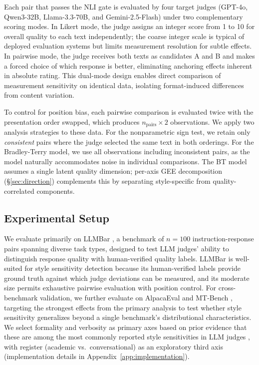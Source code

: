 Each pair that passes the NLI gate is evaluated by four target judges (GPT-4o, Qwen3-32B, Llama-3.3-70B, and Gemini-2.5-Flash) under two complementary scoring modes.
In Likert mode, the judge assigns an integer score from 1 to 10 for overall quality to each text independently; the coarse integer scale is typical of deployed evaluation systems but limits measurement resolution for subtle effects.
In pairwise mode, the judge receives both texts as candidates A and B and makes a forced choice of which response is better, eliminating anchoring effects inherent in absolute rating.
This dual-mode design enables direct comparison of measurement sensitivity on identical data, isolating format-induced differences from content variation.

To control for position bias, each pairwise comparison is evaluated twice with the presentation order swapped, which produces $n_{\text{pairs}} \times 2$ observations.
We apply two analysis strategies to these data.
For the nonparametric sign test, we retain only \emph{consistent} pairs where the judge selected the same text in both orderings.
For the Bradley-Terry model, we use all observations including inconsistent pairs, as the model naturally accommodates noise in individual comparisons.
The BT model assumes a single latent quality dimension; per-axis GEE decomposition (\S\ref{sec:direction}) complements this by separating style-specific from quality-correlated components.

\subsection{Experimental Setup}
\label{sec:setup}

We evaluate primarily on LLMBar \citep{zeng2023llmbar}, a benchmark of $n = 100$ instruction-response pairs spanning diverse task types, designed to test LLM judges' ability to distinguish response quality with human-verified quality labels.
LLMBar is well-suited for style sensitivity detection because its human-verified labels provide ground truth against which judge deviations can be measured, and its moderate size permits exhaustive pairwise evaluation with position control.
For cross-benchmark validation, we further evaluate on AlpacaEval \citep{dubois2023alpacafarm} and MT-Bench \citep{zheng2023judging}, targeting the strongest effects from the primary analysis to test whether style sensitivity generalizes beyond a single benchmark's distributional characteristics.
We select formality and verbosity as primary axes based on prior evidence that these are among the most commonly reported style sensitivities in LLM judges \citep{wu2023style,saito2023verbosity}, with register (academic vs.\ conversational) as an exploratory third axis (implementation details in Appendix~\ref{app:implementation}).

